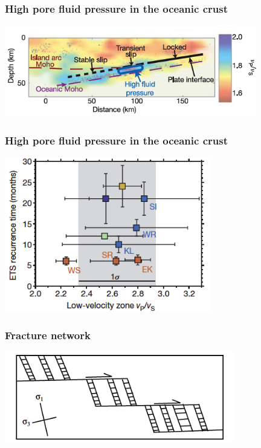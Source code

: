\documentclass{beamer}
\begin{document}
	\begin{frame}
		\frametitle{High pore fluid pressure in the oceanic crust}
		\begin{center}
			\includegraphics[trim={0cm 0cm 0cm 0cm}, clip, width=11cm]{articles/shelly_al_2006_4d.png}
		\end{center}
	\end{frame}

	\begin{frame}
		\frametitle{High pore fluid pressure in the oceanic crust}
		\begin{center}
			\includegraphics[trim={0cm 0cm 0cm 0cm}, clip, width=9cm]{articles/audet_burgmann_2014_1b.png}
		\end{center}
	\end{frame}

	\begin{frame}
		\frametitle{Fracture network}
		\begin{center}
			\includegraphics[trim={0cm 0cm 0cm 0cm}, clip, width=10cm]{articles/fagereng_harris_2014_8b.png}
		\end{center}
	\end{frame}
\end{document}
